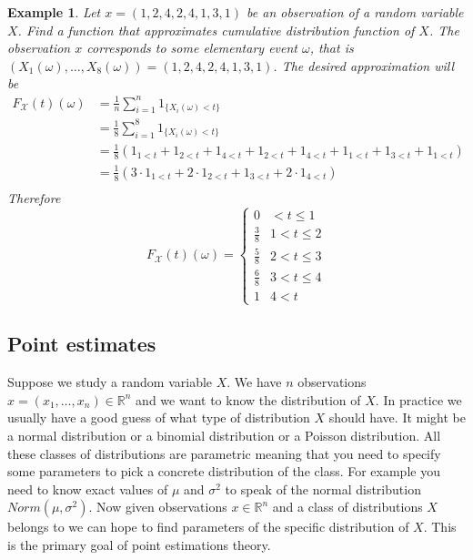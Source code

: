\documentclass[12pt]{article}
\newtheorem{example}[theorem]{Example}
\begin{document}
\begin{example} Let $x=(1,2,4,2,4,1,3,1)$ be an observation of a random variable
    $X$. Find a function that approximates cumulative distribution function of
    $X$. The observation $x$ corresponds to some elementary event $\omega$, that
    is $(X_1(\omega),\ldots,X_{8}(\omega))=(1,2,4,2,4,1,3,1)$. The desired
    approximation will be
    \begin{align*}
        F_{\mathscr{X}}(t)(\omega)
         & =\frac{1}{n}\sum_{i=1}^{n} 1_{\{X_i(\omega)<t\}} \\
         & =\frac{1}{8}\sum_{i=1}^{8} 1_{\{X_i(\omega)<t\}} \\
         & =\frac{1}{8}\left(
        1_{1<t}+1_{2<t}+1_{4<t}+1_{2<t}+1_{4<t}+1_{1<t}+1_{3<t}+1_{1<t}
        \right)                                             \\
         & =\frac{1}{8}\left(
        3\cdot 1_{1<t}+2\cdot 1_{2<t}+1_{3<t}+2\cdot 1_{4<t}
        \right)                                             \\
    \end{align*}
    Therefore
    $$
        F_{\mathscr{X}}(t)(\omega)
        =\begin{cases}
            0           & < t \leq 1   \\
            \frac{3}{8} & 1 < t \leq 2 \\
            \frac{5}{8} & 2 < t \leq 3 \\
            \frac{6}{8} & 3 < t \leq 4 \\
            1           & 4 < t
        \end{cases}
    $$
\end{example}

\subsection{Point estimates}

Suppose we study a random variable $X$. We have $n$ observations
$x=(x_1,\ldots,x_n)\in\mathbb{R}^n$ and we want to know the distribution of $X$.
In practice we usually have a good guess of what type of distribution $X$ should
have. It might be a normal distribution or a binomial distribution or a Poisson
distribution. All these classes of distributions are parametric meaning that you
need to specify some parameters to pick a concrete distribution of the class.
For example you need to know exact values of $\mu$ and $\sigma^2$ to speak of 
the normal distribution $Norm(\mu,\sigma^2)$. Now given observations
$x\in\mathbb{R}^n$ and a class of distributions $X$ belongs to we can hope to
find parameters of the specific distribution of $X$. This is the primary goal of
point estimations theory.
\end{document}
